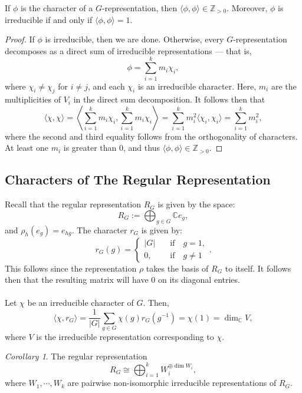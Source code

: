 \documentclass[a4paper]{report}
\theoremstyle{definition}
\theoremstyle{remark}
\theoremstyle{proposition}
\theoremstyle{conjecture}
\theoremstyle{lemma}
\theoremstyle{corollary}
\newtheorem{corollary}{Corollary}
\theoremstyle{exercise}
\theoremstyle{example}
\newcommand{\C}{\mathbb{C}}
\begin{document}
\begin{theorem}
    If $\phi$ is the character of a $G$-representation, then 
    $\langle \phi,\phi\rangle \in \mathbb{Z}_{>0}$. Moreover,
    $\phi$ is irreducible if and only if $\langle\phi,\phi\rangle = 1$.
\end{theorem}

\begin{proof}
    If $\phi$ is irreducible, then we are done. Otherwise,
    every $G$-representation decomposes as a direct sum of irreducible 
    representations --- that is, 
    $$\phi = \sum_{i=1}^km_i\chi_i,$$where
    $\chi_i\neq \chi_j$ for $i\neq j$, and each $\chi_i$ is an irreducible 
    character. Here, $m_i$ are the multiplicities of $V_i$ in the 
    direct sum decomposition.  It follows then that 
    $$\langle \chi,\chi\rangle = \left\langle \sum_{i=1}^k m_i\chi_i,\sum_{i=1}^km_i\chi_i\right\rangle = \sum_{i=1}^k m_i^2 \langle \chi_i,\chi_i\rangle = \sum_{i=1}^km_i^2,$$
    where the second and third equality follows from the orthogonality of 
    characters.
    At least one $m_i$ is greater than $0$, and thus $\langle\phi,\phi\rangle \in \mathbb{Z}_{>0}$.
\end{proof}

\subsection{Characters of The Regular Representation}

Recall that the regular representation $R_G$ is given by the space:
$$R_G:= \bigoplus_{g\in G}\C e_g,$$ 
and $\rho_h(e_g) = e_{hg}.$ The character $r_G$ is given by: 
$$r_G(g) = \begin{cases}
    \vert G \vert \quad &\text{if} \quad g = 1,\\
    0, \quad &\text{if}\quad g \neq 1
\end{cases}.$$
This follows since the representation $\rho$ takes the basis of $R_G$ to
itself. It follows then that the resulting matrix will have $0$ on its 
diagonal entries.\\\\
Let $\chi$ be an irreducible character of $G$. Then, 
$$\langle \chi,r_G\rangle = \frac{1}{\vert G \vert} \sum_{g \in G} \chi(g)r_G(g^{-1}) = \chi(1) = \dim_\C V,$$
where $V$ is the irreducible representation corresponding to $\chi$. 

\begin{corollary}
    The regular representation 
    $$R_G \cong \bigoplus_{i=1}^k W_i^{\oplus \dim W_i},$$
    where $W_1,\cdots, W_k$ are pairwise non-isomorphic irreducible 
    representations of $R_G$. 
\end{corollary}
\end{document}
